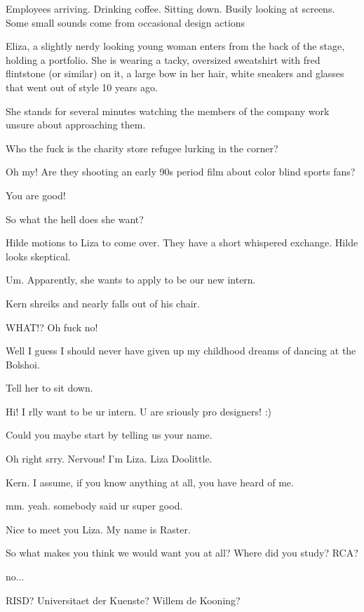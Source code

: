 \act


Employees arriving.  Drinking coffee.  Sitting down. Busily looking at screens.  Some small sounds come from occasional design actions 

Eliza, a slightly nerdy looking young woman enters from the back of the stage, holding a portfolio.  She is wearing a tacky, oversized sweatshirt with fred flintstone (or similar) on it, a large bow in her hair, white sneakers and glasses that went out of style 10 years ago.

She stands for several minutes watching the members of the company work unsure about approaching them.


\Kern Who the fuck is the charity store refugee lurking in the corner?

\Raster Oh my! Are they shooting an early 90s period film about color blind sports fans?

\Kern You are good!

\Kern So what the hell does she want?

Hilde motions to Liza to come over.  They have a short whispered exchange.  Hilde looks skeptical.

\Hilde Um.  Apparently, she wants to apply to be our new intern.

Kern shreiks and nearly falls out of his chair.

\Kern WHAT!?  Oh fuck no!

\Raster Well I guess I should never have given up my childhood dreams of dancing at the Bolshoi.

\Kern Tell her to sit down.

\Liza Hi!  I rlly want to be ur intern.  U are sriously pro designers! :)

\Kern Could you maybe start by telling us your name.

\Liza Oh right srry.  Nervous!  I'm Liza.  Liza Doolittle.

\Kern Kern.  I assume, if you know anything at all, you have heard of me.

\Liza mm.  yeah.  somebody said ur super good.

\Raster Nice to meet you Liza.  My name is Raster.

\Kern So what makes you think we would want you at all?  Where did you study?  RCA?

\Liza no...

\Kern RISD?  Universitaet der Kuenste?  Willem de Kooning?

